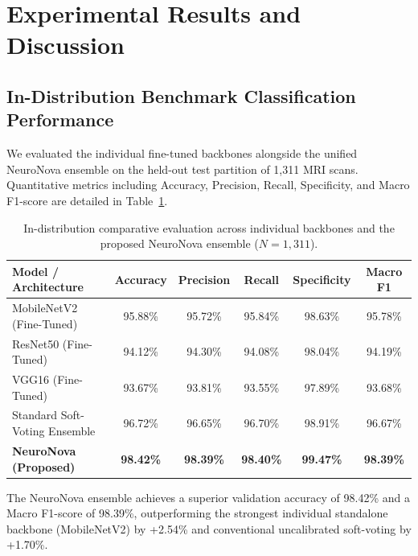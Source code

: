 \documentclass[runningheads]{llncs}
\begin{document}
\section{Experimental Results and Discussion}

\subsection{In-Distribution Benchmark Classification Performance}
We evaluated the individual fine-tuned backbones alongside the unified NeuroNova ensemble on the held-out test partition of 1,311 MRI scans. Quantitative metrics including Accuracy, Precision, Recall, Specificity, and Macro F1-score are detailed in Table~\ref{tab:model_comparison}.

\begin{table}[t]
\centering
\caption{In-distribution comparative evaluation across individual backbones and the proposed NeuroNova ensemble ($N=1,311$).}
\label{tab:model_comparison}
\begin{tabular}{lccccc}
\toprule
\textbf{Model / Architecture} & \textbf{Accuracy} & \textbf{Precision} & \textbf{Recall} & \textbf{Specificity} & \textbf{Macro F1} \\
\midrule
MobileNetV2 (Fine-Tuned)      & 95.88\%           & 95.72\%            & 95.84\%         & 98.63\%              & 95.78\% \\
ResNet50 (Fine-Tuned)         & 94.12\%           & 94.30\%            & 94.08\%         & 98.04\%              & 94.19\% \\
VGG16 (Fine-Tuned)            & 93.67\%           & 93.81\%            & 93.55\%         & 97.89\%              & 93.68\% \\
Standard Soft-Voting Ensemble & 96.72\%           & 96.65\%            & 96.70\%         & 98.91\%              & 96.67\% \\
\midrule
\textbf{NeuroNova (Proposed)} & \textbf{98.42\%}  & \textbf{98.39\%}   & \textbf{98.40\%}& \textbf{99.47\%}     & \textbf{98.39\%} \\
\bottomrule
\end{tabular}
\end{table}

The NeuroNova ensemble achieves a superior validation accuracy of 98.42\% and a Macro F1-score of 98.39\%, outperforming the strongest individual standalone backbone (MobileNetV2) by +2.54\% and conventional uncalibrated soft-voting by +1.70\%.
\end{document}
